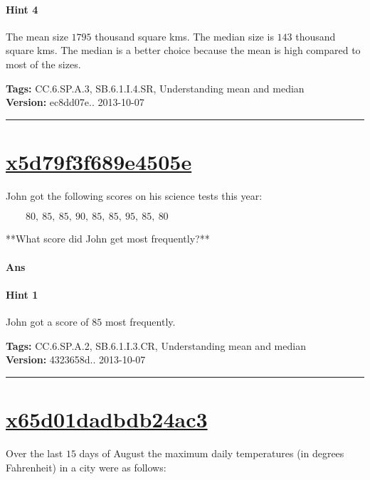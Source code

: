 \documentclass[twocolumn,10pt]{article}
\begin{document}
\paragraph{Hint 4}The mean size $1795$ thousand square kms.  The median size is $ 143$ thousand square kms.  The median is a better choice because the mean is  high compared to most of the sizes.



\medskip
\noindent
\textbf{Tags:} {\footnotesize CC.6.SP.A.3, SB.6.1.I.4.SR, Understanding mean and median}\\
\textbf{Version:} ec8dd07e.. 2013-10-07
\smallskip\hrule





\section{\href{https://www.khanacademy.org/devadmin/content/items/x5d79f3f689e4505e}{x5d79f3f689e4505e}}

\noindent
John got the following scores on his science tests this year:

$\qquad80,~85,~85,~90,~85,~85,~95,~85,~80$

**What score did John get most frequently?**



\paragraph{Ans} 

\paragraph{Hint 1}John got a score of $85$ most frequently.



\medskip
\noindent
\textbf{Tags:} {\footnotesize CC.6.SP.A.2, SB.6.1.I.3.CR, Understanding mean and median}\\
\textbf{Version:} 4323658d.. 2013-10-07
\smallskip\hrule





\section{\href{https://www.khanacademy.org/devadmin/content/items/x65d01dadbdb24ac3}{x65d01dadbdb24ac3}}

\noindent
Over the last $15$ days of August the maximum daily temperatures (in degrees Fahrenheit) in a city were as follows:
\end{document}
